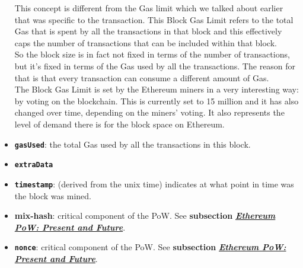 \begin{itemize}
  This concept is different from the Gas limit which we talked about
  earlier that was specific to the transaction. This Block Gas Limit
  refers to the total Gas that is spent by all the transactions in that
  block and this effectively caps the number of transactions that can be
  included within that block.\\

  So the block size is in fact not fixed in terms of the number of
  transactions, but it's fixed in terms of the Gas used by all the
  transactions. The reason for that is that every transaction can
  consume a different amount of Gas.\\

  The Block Gas Limit is set by the Ethereum miners in a very
  interesting way: by voting on the blockchain. This is currently set to
  15 million and it has also changed over time, depending on the miners'
  voting. It also represents the level of demand there is for the block
  space on Ethereum.
\item
  \textbf{\texttt{gasUsed}}: the total Gas used by all the transactions
  in this block.
\item
  \textbf{\texttt{extraData}}
\item
  \textbf{\texttt{timestamp}}: (derived from the unix time) indicates at
  what point in time was the block was mined.
\item
  \textbf{mix-hash}: critical component of the PoW. See
  \textbf{subsection}
  \href{1.4_Ethereum_core_components.md\#Ethereum-PoW:-Present-and-Future}{\emph{\textbf{Ethereum
  PoW: Present and Future}}}.
\item
  \textbf{\texttt{nonce}}: critical component of the PoW. See
  \textbf{subsection}
  \href{1.4_Ethereum_core_components.md\#Ethereum-PoW:-Present-and-Future}{\emph{\textbf{Ethereum
  PoW: Present and Future}}}.
\end{itemize}
